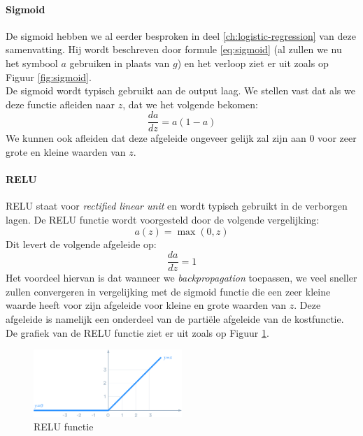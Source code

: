 \paragraph{Sigmoid}

De sigmoid hebben we al eerder besproken in deel \ref{ch:logistic-regression} van deze samenvatting. Hij wordt beschreven door formule \ref{eq:sigmoid} (al zullen we nu het symbool $a$ gebruiken in plaats van $g$) en het verloop ziet er uit zoals op Figuur \ref{fig:sigmoid}. \\
\newline
De sigmoid wordt typisch gebruikt aan de output laag. We stellen vast dat als we deze functie afleiden naar $z$, dat we het volgende bekomen:
\begin{equation}
	\frac{da}{dz} = a (1 - a)
\end{equation}
\noindent
We kunnen ook afleiden dat deze afgeleide ongeveer gelijk zal zijn aan 0 voor zeer grote en kleine waarden van $z$. 

\paragraph{RELU}

RELU staat voor \textit{rectified linear unit} en wordt typisch gebruikt in de verborgen lagen. De RELU functie wordt voorgesteld door de volgende vergelijking:
\begin{equation}
	a(z) = \max(0, z)
\end{equation}
\noindent
Dit levert de volgende afgeleide op:
\begin{equation}
	\frac{da}{dz} = 1
\end{equation}
\noindent
Het voordeel hiervan is dat wanneer we \textit{backpropagation} toepassen, we veel sneller zullen convergeren in vergelijking met de sigmoid functie die een zeer kleine waarde heeft voor zijn afgeleide voor kleine en grote waarden van $z$. Deze afgeleide is namelijk een onderdeel van de partiële afgeleide van de kostfunctie. \\
\newline
De grafiek van de RELU functie ziet er uit zoals op Figuur \ref{fig:relu}.
\begin{figure}[h]
	\centering
	\includegraphics[width=0.5\textwidth]{images/16-relu.png}
	\caption{RELU functie}
	\label{fig:relu}
\end{figure}

